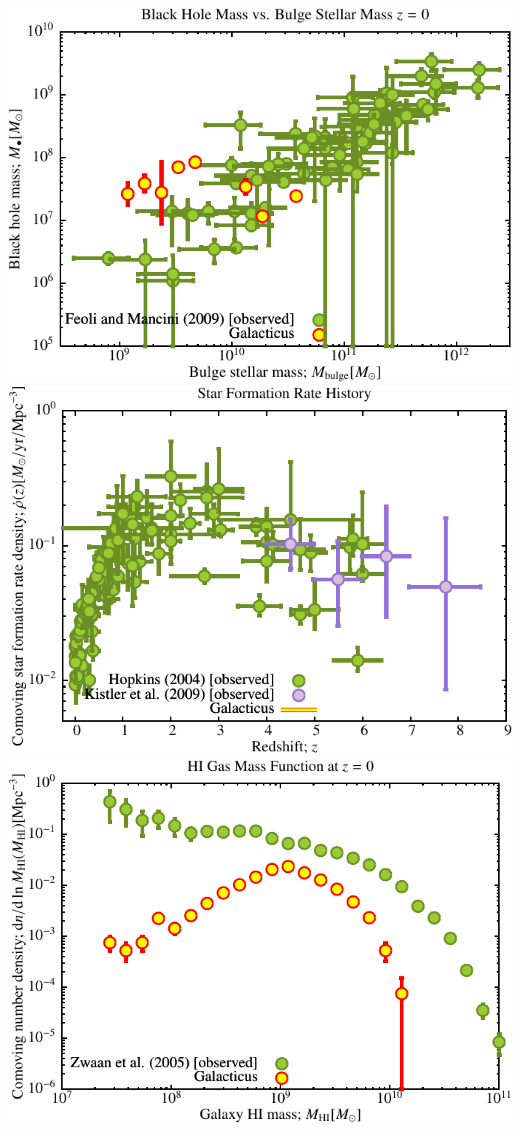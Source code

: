 \includegraphics[scale=0.6]{r256/h100/stages_12_h_44/Plot_Black_Hole_vs_Bulge_Mass.pdf}
\includegraphics[scale=0.6]{r256/h100/stages_12_h_44/Plot_Star_Formation_History.pdf} \\
\includegraphics[scale=0.6]{r256/h100/stages_12_h_44/Plot_HI_Mass_Function.pdf}

